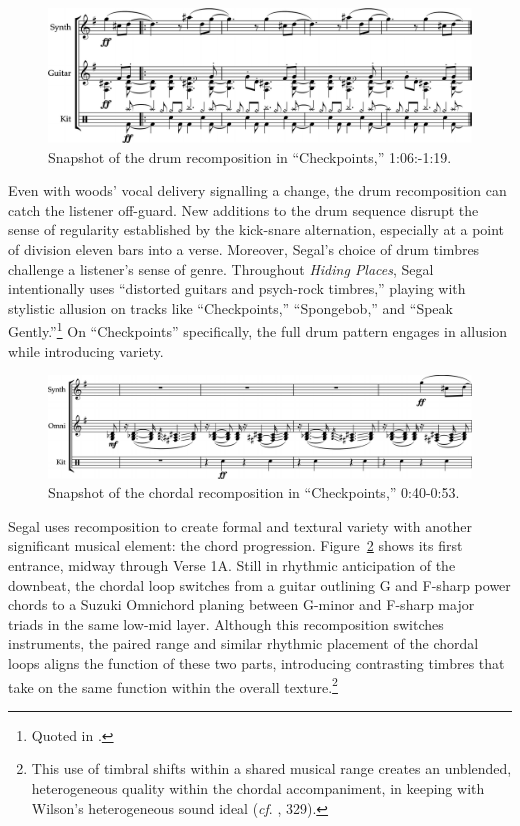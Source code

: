     \begin{figure}[ht]
        \centering
        \includegraphics[width=\textwidth]{images/figures/chp 02/106119checkpointsmain.pdf}
        \caption{Snapshot of the drum recomposition in ``Checkpoints,'' 1:06:-1:19.}
        \label{fig:checkpointsmain}
    \end{figure}

Even with woods' vocal delivery signalling a change, the drum recomposition can catch the listener
off-guard. New additions to the drum sequence disrupt the sense of regularity established by the 
kick-snare alternation, especially at a point of division eleven bars into a verse. Moreover, Segal's
choice of drum timbres challenge a listener's sense of genre. Throughout \emph{Hiding Places}, Segal
intentionally uses ``distorted guitars and psych-rock timbres,'' playing with stylistic allusion on 
tracks like ``Checkpoints,'' ``Spongebob,'' and ``Speak Gently.''\footnote{Quoted in 
\cite{backwoodzhiphopKennySegalPresents2019}.} On ``Checkpoints'' specifically, the full drum pattern
engages in allusion while introducing variety.

    \begin{figure}[ht]
        \centering
        \includegraphics[width=\textwidth]{images/figures/chp 02/040053checkpointsrecomp.pdf}
        \caption{Snapshot of the chordal recomposition in ``Checkpoints,'' 0:40-0:53.}
        \label{fig:checkpointsrecomp}
    \end{figure}

Segal uses recomposition to create formal and textural variety with another significant musical 
element: the chord progression. Figure~\ref{fig:checkpointsrecomp} shows its first entrance, midway 
through Verse 1A. Still in rhythmic anticipation of the downbeat, the chordal loop switches from a 
guitar outlining G and F-sharp power chords to a Suzuki Omnichord planing between G-minor and F-sharp
major triads in the same low-mid layer. Although this recomposition switches instruments, the paired 
range and similar rhythmic placement of the chordal loops aligns the function of these two parts, 
introducing contrasting timbres that take on the same function within the overall 
texture.\footnote{This use of timbral shifts within a shared musical range creates an unblended,
heterogeneous quality within the chordal accompaniment, in keeping with Wilson's heterogeneous 
sound ideal (\textit{cf}.  \cite{ollywilsonHeterogeneousSoundIdeal1992}, 329).}

